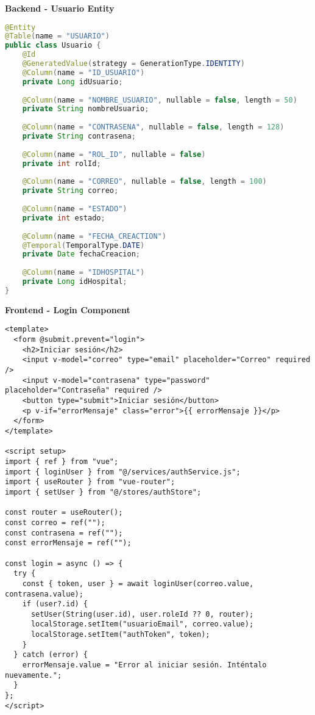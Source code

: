 \documentclass[12pt,a4paper]{article}
\begin{document}
\textbf{Backend - Usuario Entity}
\begin{lstlisting}[language=java]
@Entity
@Table(name = "USUARIO")
public class Usuario {
    @Id
    @GeneratedValue(strategy = GenerationType.IDENTITY)
    @Column(name = "ID_USUARIO")
    private Long idUsuario;
    
    @Column(name = "NOMBRE_USUARIO", nullable = false, length = 50)
    private String nombreUsuario;
    
    @Column(name = "CONTRASENA", nullable = false, length = 128)
    private String contrasena;
    
    @Column(name = "ROL_ID", nullable = false)
    private int rolId;
    
    @Column(name = "CORREO", nullable = false, length = 100)
    private String correo;
    
    @Column(name = "ESTADO")
    private int estado;
    
    @Column(name = "FECHA_CREACTION")
    @Temporal(TemporalType.DATE)
    private Date fechaCreacion;
    
    @Column(name = "IDHOSPITAL")
    private Long idHospital;
}
\end{lstlisting}

\textbf{Frontend - Login Component}
\begin{lstlisting}[language=vue]
<template>
  <form @submit.prevent="login">
    <h2>Iniciar sesión</h2>
    <input v-model="correo" type="email" placeholder="Correo" required />
    <input v-model="contrasena" type="password" placeholder="Contraseña" required />
    <button type="submit">Iniciar sesión</button>
    <p v-if="errorMensaje" class="error">{{ errorMensaje }}</p>
  </form>
</template>

<script setup>
import { ref } from "vue";
import { loginUser } from "@/services/authService.js";
import { useRouter } from "vue-router";
import { setUser } from "@/stores/authStore";

const router = useRouter();
const correo = ref("");
const contrasena = ref("");
const errorMensaje = ref("");

const login = async () => {
  try {
    const { token, user } = await loginUser(correo.value, contrasena.value);
    if (user?.id) {
      setUser(String(user.id), user.roleId ?? 0, router);
      localStorage.setItem("usuarioEmail", correo.value);
      localStorage.setItem("authToken", token);
    }
  } catch (error) {
    errorMensaje.value = "Error al iniciar sesión. Inténtalo nuevamente.";
  }
};
</script>
\end{lstlisting}
\end{document}
